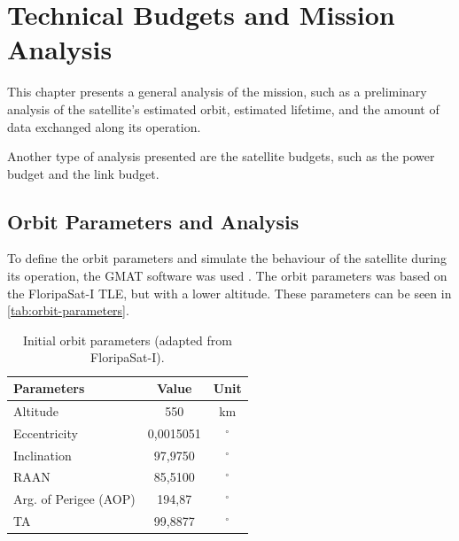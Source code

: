 %
%
%
%
%

%
%
%
%
%
%

\chapter{Technical Budgets and Mission Analysis} \label{ch:budgets}

This chapter presents a general analysis of the mission, such as a preliminary analysis of the satellite's estimated orbit, estimated lifetime, and the amount of data exchanged along its operation.

Another type of analysis presented are the satellite budgets, such as the power budget and the link budget.

\section{Orbit Parameters and Analysis}

To define the orbit parameters and simulate the behaviour of the satellite during its operation, the GMAT software was used \cite{gmat}. The orbit parameters was based on the FloripaSat-I TLE, but with a lower altitude. These parameters can be seen in \autoref{tab:orbit-parameters}.

\begin{table}[!h]
    \centering
    \begin{tabular}{lcc}
        \toprule[1.5pt]
        \textbf{Parameters} & \textbf{Value} & \textbf{Unit} \\
        \midrule
        Altitude                & 550           & km \\
        Eccentricity            & 0,0015051     & $^{\circ}$ \\
        Inclination             & 97,9750       & $^{\circ}$ \\
        RAAN                    & 85,5100       & $^{\circ}$ \\
        Arg. of Perigee (AOP)   & 194,87        & $^{\circ}$ \\
        TA                      & 99,8877       & $^{\circ}$ \\
        \bottomrule[1.5pt]
    \end{tabular}
    \caption{Initial orbit parameters (adapted from FloripaSat-I).}
    \label{tab:orbit-parameters}
\end{table}

